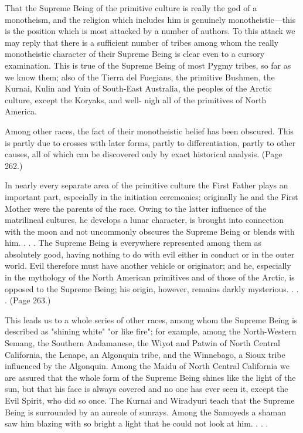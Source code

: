 That the Supreme Being of the primitive culture is really the god of a monotheism, and the
religion which includes him is genuinely monotheistic—this is the position which is most
attacked by a number of authors. To this attack we may reply that there is a sufficient number
of tribes among whom the really monotheistic character of their Supreme Being is clear even
to a cursory examination. This is true of the Supreme Being of most Pygmy tribes, so far as
we know them; also of the Tierra del Fuegians, the primitive Bushmen, the Kurnai, Kulin and
Yuin of South-East Australia, the peoples of the Arctic culture, except the Koryaks, and well-
nigh all of the primitives of North America.

Among other races, the fact of their monotheistic belief has been obscured. This is partly due
to crosses with later forms, partly to differentiation, partly to other causes, all of which can
be discovered only by exact historical analysis. (Page 262.)

In nearly every separate area of the primitive culture the First Father plays an important part,
especially in the initiation ceremonies; originally he and the First Mother were the parents of
the race. Owing to the latter influence of the matrilineal cultures, he develops a lunar
character, is brought into connection with the moon and not uncommonly obscures the
Supreme Being or blends with him. . . . The Supreme Being is everywhere represented
among them as absolutely good, having nothing to do with evil either in conduct or in the
outer world. Evil therefore must have another vehicle or originator; and he, especially in the
mythology of the North American primitives and of those of the Arctic, is opposed to the
Supreme Being; his origin, however, remains darkly mysterious. . . . (Page 263.)

This leads us to a whole series of other races, among whom the Supreme Being is described
as "shining white" "or like fire"; for example, among the North-Western Semang, the
Southern Andamanese, the Wiyot and Patwin of North Central California, the Lenape, an
Algonquin tribe, and the Winnebago, a Sioux tribe influenced by the Algonquin. Among the
Maidu of North Central California we are assured that the whole form of the Supreme Being
shines like the light of the sun, but that his face is always covered and no one has ever seen it,
except the Evil Spirit, who did so once. The Kurnai and Wiradyuri teach that the Supreme
Being is surrounded by an aureole of sunrays. Among the Samoyeds a shaman saw him
blazing with so bright a light that he could not look at him. . . .

